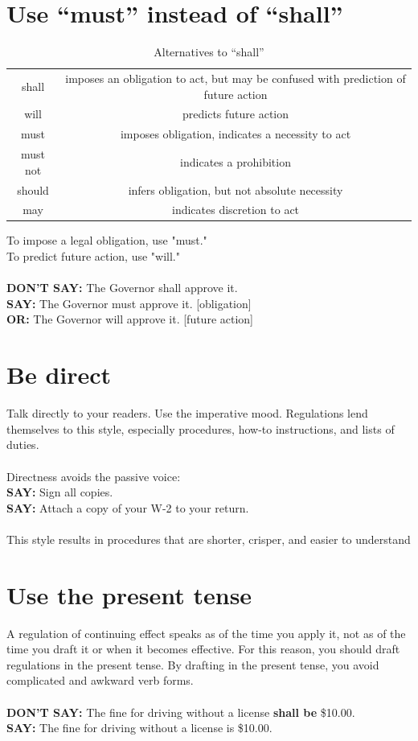 \documentclass[12pt, letterpaper]{report}
\begin{document}
\begin{linenumbers}
    \section{Use ``must'' instead of ``shall''}
    \begin{table}[h]
        \centering
        \begin{tabular}{c|c}
            shall & imposes an obligation to act, but may be confused with prediction of future action \\
            will & predicts future action\\
            must & imposes obligation, indicates a necessity to act\\
            must not & 	indicates a prohibition\\
            should & infers obligation, but not absolute necessity\\
            may & indicates discretion to act
        \end{tabular}
        \caption{Alternatives to ``shall''}
        \label{tab:shallalts}
    \end{table}
    To impose a legal obligation, use "must."\\
    To predict future action, use "will."\\\\
    \textbf{DON'T SAY: }The Governor shall approve it.\\
    \textbf{SAY: }The Governor must approve it. [obligation]\\
    \textbf{OR: }The Governor will approve it. [future action]
    \section{Be direct}
    Talk directly to your readers. Use the imperative mood. Regulations lend themselves to this style, especially procedures, how-to instructions, and lists of duties.\\\\
    Directness avoids the passive voice:\\
    \textbf{SAY: }Sign all copies.\\
    \textbf{SAY: }Attach a copy of your W-2 to your return.\\\\
    This style results in procedures that are shorter, crisper, and easier to understand
    \section{Use the present tense}
    A regulation of continuing effect speaks as of the time you apply it, not as of the time you draft it or when it becomes effective. For this reason, you should draft regulations in the present tense. By drafting in the present tense, you avoid complicated and awkward verb forms.\\\\
    \textbf{DON'T SAY: }The fine for driving without a license \textbf{shall be} \$10.00.\\
    \textbf{SAY: }The fine for driving without a license is \$10.00.

\end{linenumbers}
\end{document}
